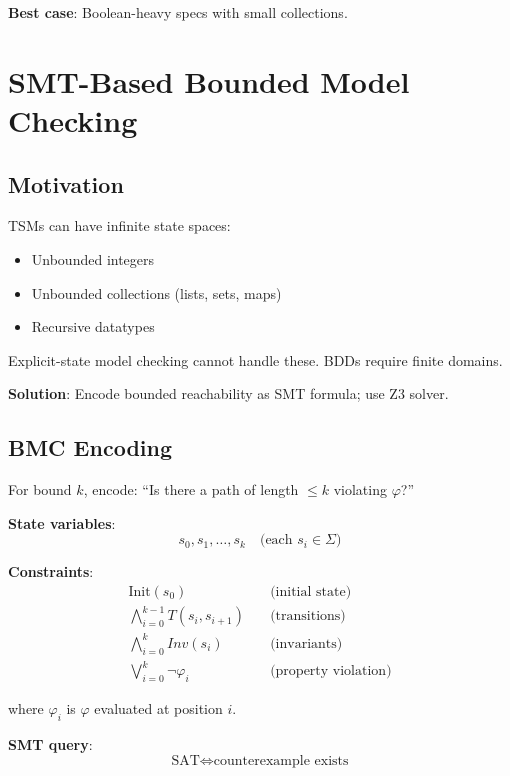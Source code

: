 \documentclass[conference]{IEEEtran}
\begin{document}
\textbf{Best case}: Boolean-heavy specs with small collections.

\section{SMT-Based Bounded Model Checking}
\label{sec:smt}

\subsection{Motivation}

TSMs can have infinite state spaces:
\begin{itemize}
\item Unbounded integers
\item Unbounded collections (lists, sets, maps)
\item Recursive datatypes
\end{itemize}

Explicit-state model checking cannot handle these. BDDs require finite domains.

\textbf{Solution}: Encode bounded reachability as SMT formula; use Z3 solver.

\subsection{BMC Encoding}

For bound $k$, encode: ``Is there a path of length $\leq k$ violating $\varphi$?''

\textbf{State variables}:
\begin{equation}
s_0, s_1, \ldots, s_k \quad \text{(each } s_i \in \Sigma \text{)}
\end{equation}

\textbf{Constraints}:
\begin{align}
\text{Init}(s_0) &\quad \text{(initial state)} \\
\bigwedge_{i=0}^{k-1} T(s_i, s_{i+1}) &\quad \text{(transitions)} \\
\bigwedge_{i=0}^{k} Inv(s_i) &\quad \text{(invariants)} \\
\bigvee_{i=0}^{k} \neg\varphi_i &\quad \text{(property violation)}
\end{align}

where $\varphi_i$ is $\varphi$ evaluated at position $i$.

\textbf{SMT query}:
\begin{equation}
\text{SAT} \Leftrightarrow \text{counterexample exists}
\end{equation}
\end{document}
